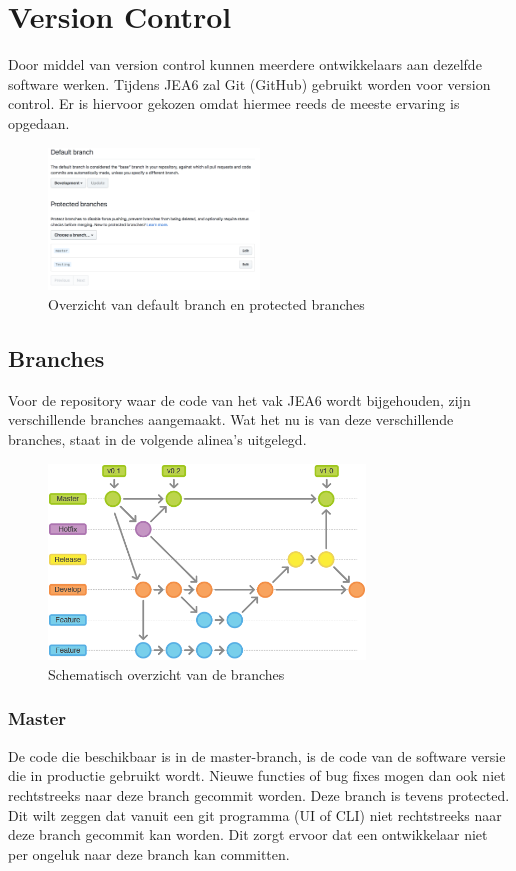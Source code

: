 \chapter{Version Control}
	Door middel van version control kunnen meerdere ontwikkelaars aan dezelfde software werken.
	Tijdens JEA6 zal Git (GitHub) gebruikt worden voor version control. Er is hiervoor gekozen omdat hiermee reeds de meeste ervaring is opgedaan.
	
	\begin{figure}[H]
			\includegraphics[width=0.50\textwidth]{images/configuredBranches.png}
			\caption{Overzicht van default branch en protected branches}
			\label{fig:ConfiguredBranches}
	\end{figure}
	
	\section{Branches}
	Voor de repository waar de code van het vak JEA6 wordt bijgehouden, zijn verschillende branches aangemaakt. Wat het nu is van deze verschillende branches, staat in de volgende alinea's uitgelegd.
	
	\begin{figure}[H]
			\includegraphics[width=0.75\textwidth]{images/BranchScheme.png}
			\caption{Schematisch overzicht van de branches}
			\label{fig:BranchScheme}
	\end{figure}
	
	\subsection{Master}
	De code die beschikbaar is in de master-branch, is de code van de software versie die in productie gebruikt wordt. Nieuwe functies of bug fixes mogen dan ook niet rechtstreeks naar deze branch gecommit worden.
	Deze branch is tevens protected. Dit wilt zeggen dat vanuit een git programma (UI of CLI) niet rechtstreeks naar deze branch gecommit kan worden. Dit zorgt ervoor dat een ontwikkelaar niet per ongeluk naar deze branch kan committen.
	
